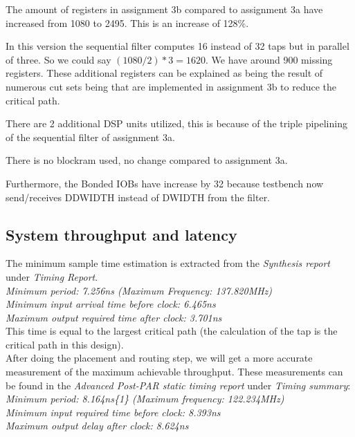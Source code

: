 \documentclass[a4paper,twoside,11pt, fleqn]{article}
\begin{document}
The amount of registers in assignment 3b compared to assignment 3a have increased from 1080 to 2495. This is an increase of 128\%. 

In this version the sequential filter computes 16 instead of 32 taps but in parallel of three. So we could say $(1080/2)*3=1620$. We have around 900 missing registers. These additional registers can be explained as being the result of numerous cut sets being that are implemented in assignment 3b to reduce the critical path.

\smallskip

There are 2 additional DSP units utilized, this is because of the triple pipelining of the sequential filter of assignment 3a.

There is no blockram used, no change compared to assignment 3a.

Furthermore, the Bonded IOBs have increase by 32 because testbench now send/receives DDWIDTH instead of DWIDTH from the filter.

\subsection{System throughput and latency}
\label{sec:thr3b}
The minimum sample time estimation is extracted from the \textit{Synthesis report} under \textit{Timing Report}.\\

   \textit{Minimum period:  7.256ns (Maximum Frequency: 137.820MHz)\\
   Minimum input arrival time before clock: 6.465ns\\
   Maximum output required time after clock: 3.701ns}\\

This time is equal to the largest critical path (the calculation of the tap is the critical path in this design).\\

After doing the placement and routing step, we will get a more accurate measurement of the maximum achievable throughput. These measurements can be found in the \textit{Advanced Post-PAR static timing report} under \textit{Timing summary}:\\

\textit{Minimum period:   8.164ns\{1\}   (Maximum frequency: 122.234MHz)\\
   Minimum input required time before clock:   8.393ns\\
   Maximum output delay after clock:   8.624ns}\\
\end{document}
